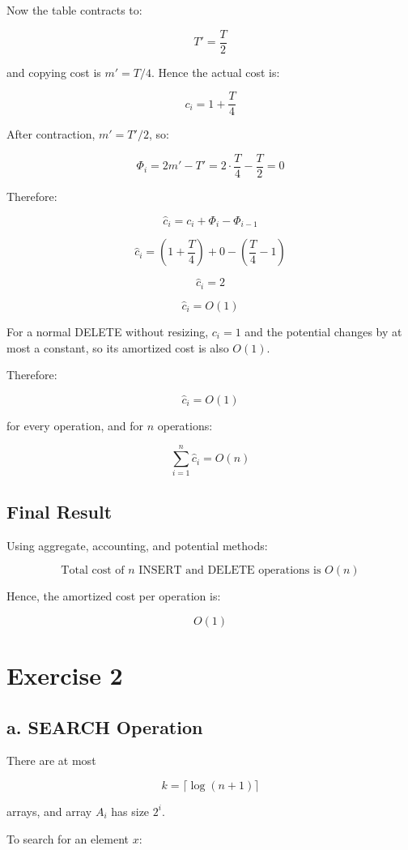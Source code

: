 \documentclass[12pt]{article}
\begin{document}
Now the table contracts to:

\[
T' = \frac{T}{2}
\]

and copying cost is $m' = T/4$. Hence the actual cost is:

\[
c_i = 1 + \frac{T}{4}
\]

After contraction, $m' = T'/2$, so:

\[
\Phi_i = 2m' - T' = 2\cdot \frac{T}{4} - \frac{T}{2} = 0
\]

Therefore:

\[
\hat{c}_i = c_i + \Phi_i - \Phi_{i-1}
\]

\[
\hat{c}_i = \left(1+\frac{T}{4}\right) + 0 - \left(\frac{T}{4}-1\right)
\]

\[
\hat{c}_i = 2
\]

\[
\hat{c}_i = O(1)
\]

For a normal DELETE without resizing, $c_i = 1$ and the potential changes by at most a constant, so its amortized cost is also $O(1)$.

Therefore:

\[
\hat{c}_i = O(1)
\]

for every operation, and for $n$ operations:

\[
\sum_{i=1}^{n} \hat{c}_i = O(n)
\]

\subsection*{Final Result}

Using aggregate, accounting, and potential methods:

\[
\boxed{\text{Total cost of } n \text{ INSERT and DELETE operations is } O(n)}
\]

Hence, the amortized cost per operation is:

\[
\boxed{O(1)}
\]

\section{Exercise 2}

\subsection*{a. SEARCH Operation}

There are at most

\[
k = \lceil \log(n+1) \rceil
\]

arrays, and array \(A_i\) has size \(2^i\).

To search for an element \(x\):
\end{document}
